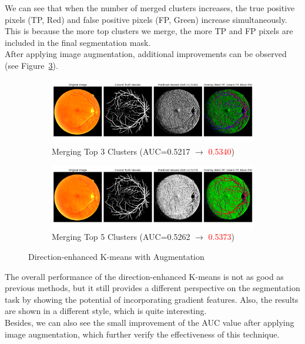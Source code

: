 \documentclass[12pt,letterpaper]{article}
\begin{document}
\noindent
We can see that when the number of merged clusters increases, the true positive pixels (TP, Red) and false positive pixels (FP, Green) increase simultaneously. This is because the more top clusters we merge, the more TP and FP pixels are included in the final segmentation mask. \\ 
After applying image augmentation, additional improvements can be observed (see Figure~\ref{fig:de_aug}).
\begin{figure}[H]
    \centering
    \begin{subfigure}[H]{\textwidth}
        \centering
        \includegraphics[scale=0.35]{Figures/6 Directed (Merge 3 Clusters).png}
        \vspace{-0.5cm}
        \caption{Merging Top 3 Clusters (AUC=0.5217 $\rightarrow$ \textcolor{red}{0.5340})}
        \label{fig:de_aug3}
    \end{subfigure}
    \begin{subfigure}[H]{\textwidth}
        \centering
        \includegraphics[scale=0.35]{Figures/6 Directed (Merge 5 Clusters).png}
        \vspace{-0.5cm}
        \caption{Merging Top 5 Clusters (AUC=0.5262 $\rightarrow$ \textcolor{red}{0.5373})}
        \label{fig:de_aug5}
    \end{subfigure}
    \caption{Direction-enhanced K-means with Augmentation}
    \label{fig:de_aug}
\end{figure}
\noindent
The overall performance of the direction-enhanced K-means is not as good as previous methods, but it still provides a different perspective on the segmentation task by showing the potential of incorporating gradient features. Also, the results are shown in a different style, which is quite interesting. \\
Besides, we can also see the small improvement of the AUC value after applying image augmentation, which further verify the effectiveness of this technique. 
\end{document}
